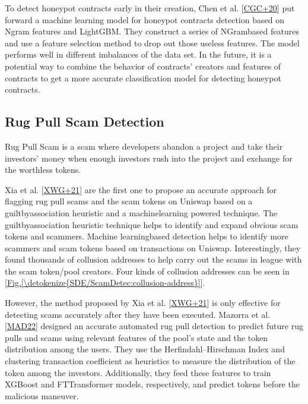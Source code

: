 \documentclass[letterpaper,10pt,english]{jupyterBook}
\begin{document}
\sphinxAtStartPar
To detect honeypot contracts early in their creation, Chen et al. {[}\hyperlink{cite.SDE/ScamDetec:id139}{CGC+20}{]} put forward a machine learning model for honeypot contracts detection based on N\sphinxhyphen{}gram features and LightGBM. They construct a series of N\sphinxhyphen{}Gram\sphinxhyphen{}based features and use a feature selection method to drop out those useless features. The model performs well in different imbalances of the data set. In the future, it is a potential way to combine the behavior of contracts’ creators and features of contracts to get a more accurate classification model for detecting honeypot contracts.


\subsection{Rug Pull Scam Detection}
\label{\detokenize{SDE/ScamDetec:rug-pull-scam-detection}}
\begin{sphinxShadowBox}

\sphinxAtStartPar
Rug Pull Scam is a scam where developers abandon a project and take their investors’ money when enough investors rush into the project and exchange for the worthless tokens.
\end{sphinxShadowBox}

\sphinxAtStartPar
Xia et al. {[}\hyperlink{cite.SDE/ScamDetec:id140}{XWG+21}{]} are the first one to propose an accurate approach for flagging rug pull scams and the scam tokens on Uniswap based on a guilt\sphinxhyphen{}by\sphinxhyphen{}association heuristic and a machine\sphinxhyphen{}learning powered technique. The guilt\sphinxhyphen{}by\sphinxhyphen{}association heuristic technique helps to identify and expand
obvious scam tokens and scammers. Machine learning\sphinxhyphen{}based detection helps to identify more scammers and scam tokens based on transactions on Uniswap. Interestingly, they found thousands of collusion addresses to help carry out the scams in league with the scam token/pool creators. Four kinds of collusion addresses can be seen in {[}\hyperref[\detokenize{SDE/ScamDetec:collusion-address}]{Fig.\@ \ref{\detokenize{SDE/ScamDetec:collusion-address}}}{]}.

\sphinxAtStartPar
However, the method proposed by Xia et al. {[}\hyperlink{cite.SDE/ScamDetec:id140}{XWG+21}{]} is only effective for detecting scams accurately after they have been executed. Mazorra et al. {[}\hyperlink{cite.SDE/ScamDetec:id141}{MAD22}{]} designed an accurate automated rug pull detection to predict future rug pulls and scams using relevant features of the pool’s state and the token distribution among the users. They use the Herfindahl–Hirschman Index and clustering transaction coefficient as heuristics to measure the distribution of the token among the investors. Additionally, they feed these features to train XGBoost and FT\sphinxhyphen{}Transformer models, respectively, and predict tokens before the malicious maneuver.
\end{document}
